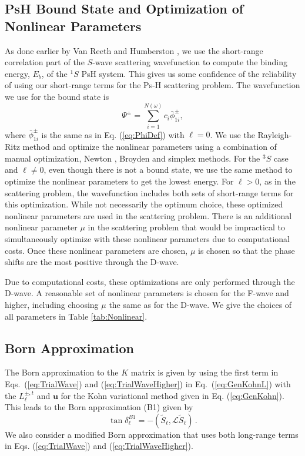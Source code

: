 \documentclass[preprint,showpacs,showkeys,preprintnumbers,amsmath,amssymb,longbibliography,pra,aps]{revtex4-1}
\begin{document}

\subsection{PsH Bound State and Optimization of Nonlinear Parameters}
As done earlier by Van Reeth and Humberston \cite{VanReeth2003,VanReeth2004},
we use the short-range correlation part of the $S$-wave scattering wavefunction
to compute the binding energy, $E_b$, of the $^1S$ PsH system. This gives us
some confidence of the reliability of using our short-range terms for the Ps-H 
scattering problem. The wavefunction we use for the bound state is
\begin{equation}
\label{eq:BoundWavefn}
\Psi^\pm = \sum_{i=1}^{N(\omega)} c_i \bar{\phi}_{1i}^\pm,
\end{equation}
where $\bar{\phi}_{1i}^\pm$ is the same as in Eq. (\ref{eq:PhiDef}) with
$\ell = 0$. We use the Rayleigh-Ritz method and optimize the 
nonlinear parameters using a combination of manual optimization,
Newton \cite{Yan1999}, Broyden \cite{Sauer2006} and simplex \cite{GSL}
methods. For the $^3S$ case
and $\ell \neq 0$, even though there is not a bound state, we use the same
method to optimize the nonlinear parameters to get the lowest energy.
For $\ell > 0$, as in the scattering problem, the wavefunction includes
both sets of short-range terms for this 
optimization. While not necessarily the optimum choice, these optimized 
nonlinear parameters are used in the scattering problem.
There is an 
additional nonlinear parameter $\mu$ in the scattering problem that would be 
impractical to simultaneously optimize with these nonlinear parameters due to 
computational costs. Once these nonlinear parameters are chosen, $\mu$ is 
chosen so that the phase shifts are the most positive through the D-wave.

Due to computational costs, these optimizations are only performed through
the D-wave. A reasonable set of nonlinear parameters is chosen for the F-wave
and higher, including choosing $\mu$ the same as for the D-wave.
We give the choices of all parameters in Table \ref{tab:Nonlinear}.

\subsection{Born Approximation}
The Born approximation to the $K$ matrix \cite{Bransden2003} is given by
using the first term in Eqs.~(\ref{eq:TrialWave}) and
(\ref{eq:TrialWaveHigher}) in Eq.~(\ref{eq:GenKohnL}) with the $L^{\pm,t}_\ell$
and $\textbf{u}$ for the Kohn variational method given in Eq. (\ref{eq:GenKohn}).
This leads to the Born approximation (B1) given by
\begin{equation}
\label{eq:Born}
\tan\delta_\ell^{B1} = -(\widetilde{S}_\ell,\mathcal{L}\widetilde{S}_\ell )\,.
\end{equation}
We also consider a modified Born approximation that uses both long-range terms
in Eqs. (\ref{eq:TrialWave}) and (\ref{eq:TrialWaveHigher}).
\end{document}
